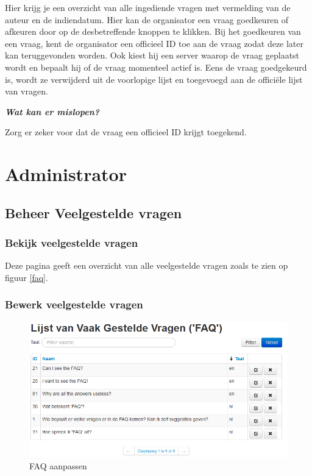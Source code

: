 \documentclass[]{article}
\begin{document}
Hier krijg je een overzicht van alle ingediende vragen met vermelding van de auteur en de indiendatum. Hier kan de organisator een vraag goedkeuren of afkeuren door op de desbetreffende knoppen te klikken. Bij het goedkeuren van een vraag, kent de organisator een officieel ID toe aan de vraag zodat deze later kan teruggevonden worden. Ook kiest hij een server waarop de vraag geplaatst wordt en bepaalt hij of de vraag momenteel actief is. Eens de vraag goedgekeurd is, wordt ze verwijderd uit de voorlopige lijst en toegevoegd aan de officiële lijst van vragen.

\textbf{\textit{Wat kan er mislopen?}}

Zorg er zeker voor dat de vraag een officieel ID krijgt toegekend.

\section{Administrator}

\subsection{Beheer Veelgestelde vragen}

\subsubsection{Bekijk veelgestelde vragen}
Deze pagina geeft een overzicht van alle veelgestelde vragen zoals te zien op figuur \ref{faq}.

\subsubsection{Bewerk veelgestelde vragen}

\begin{figure}[!ht]
	\centering
	\includegraphics[width=1\textwidth]{img/faqmgmt}
	\caption{FAQ aanpassen}
	\label{faqmgmt}
\end{figure}
\end{document}
